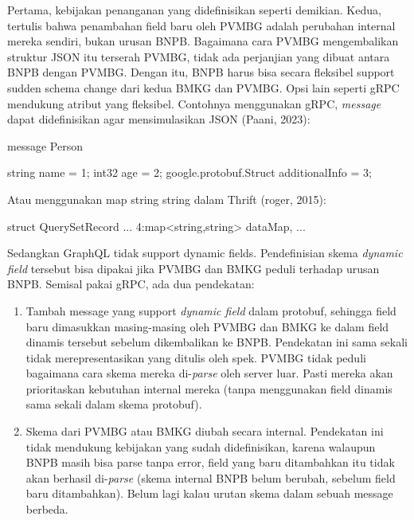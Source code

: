 Pertama, kebijakan penanganan yang didefinisikan seperti demikian. Kedua, tertulis bahwa penambahan field baru oleh PVMBG adalah perubahan internal mereka sendiri, bukan urusan BNPB. Bagaimana cara PVMBG mengembalikan struktur JSON itu terserah PVMBG, tidak ada perjanjian yang dibuat antara BNPB dengan PVMBG. Dengan itu, BNPB harus bisa secara fleksibel support sudden schema change dari kedua BMKG dan PVMBG. Opsi lain seperti gRPC mendukung atribut yang fleksibel. Contohnya menggunakan gRPC, \emph{message} dapat didefinisikan agar mensimulasikan JSON (Paani, 2023):

\begin{codebox}
message Person
{
   string name = 1;
   int32 age = 2;
   google.protobuf.Struct additionalInfo = 3;

}
\end{codebox}

Atau menggunakan map string string dalam Thrift (roger, 2015):

\begin{codebox}
struct QuerySetRecord {
    ...
    4:map<string,string> dataMap,
    ...
}
\end{codebox}

Sedangkan GraphQL tidak support dynamic fields. Pendefinisian skema \emph{dynamic field} tersebut bisa dipakai jika PVMBG dan BMKG peduli terhadap urusan BNPB. Semisal pakai gRPC, ada dua pendekatan:

\begin{enumerate}
\def\labelenumi{\arabic{enumi}.}
\tightlist
\item
  Tambah message yang support \emph{dynamic field} dalam protobuf, sehingga field baru dimasukkan masing-masing oleh PVMBG dan BMKG ke dalam field dinamis tersebut sebelum dikembalikan ke BNPB. Pendekatan ini sama sekali tidak merepresentasikan yang ditulis oleh spek. PVMBG tidak peduli bagaimana cara skema mereka di-\emph{parse} oleh server luar. Pasti mereka akan prioritaskan kebutuhan internal mereka (tanpa menggunakan field dinamis sama sekali dalam skema protobuf).\\
\item
  Skema dari PVMBG atau BMKG diubah secara internal. Pendekatan ini tidak mendukung kebijakan yang sudah didefinisikan, karena walaupun BNPB masih bisa parse tanpa error, field yang baru ditambahkan itu tidak akan berhasil di-\emph{parse} (skema internal BNPB belum berubah, sebelum field baru ditambahkan). Belum lagi kalau urutan skema dalam sebuah message berbeda.
\end{enumerate}

